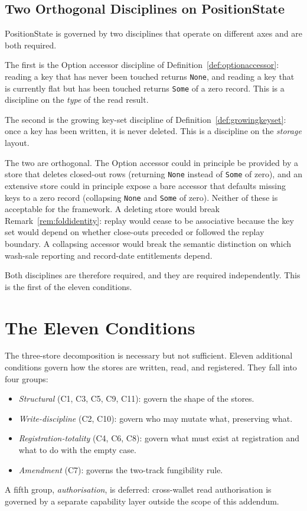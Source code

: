 \documentclass[11pt,a4paper]{article}
\begin{document}
\subsection{Two Orthogonal Disciplines on PositionState}

PositionState is governed by two disciplines that operate on different axes and are both required.

The first is the Option accessor discipline of Definition~\ref{def:optionaccessor}: reading a key that has never been touched returns \texttt{None}, and reading a key that is currently flat but has been touched returns \texttt{Some} of a zero record. This is a discipline on the \emph{type} of the read result.

The second is the growing key-set discipline of Definition~\ref{def:growingkeyset}: once a key has been written, it is never deleted. This is a discipline on the \emph{storage} layout.

The two are orthogonal. The Option accessor could in principle be provided by a store that deletes closed-out rows (returning \texttt{None} instead of \texttt{Some} of zero), and an extensive store could in principle expose a bare accessor that defaults missing keys to a zero record (collapsing \texttt{None} and \texttt{Some} of zero). Neither of these is acceptable for the framework. A deleting store would break Remark~\ref{rem:foldidentity}: replay would cease to be associative because the key set would depend on whether close-outs preceded or followed the replay boundary. A collapsing accessor would break the semantic distinction on which wash-sale reporting and record-date entitlements depend.

Both disciplines are therefore required, and they are required independently. This is the first of the eleven conditions.

\clearpage
\section{The Eleven Conditions}
\label{sec:conditions}

The three-store decomposition is necessary but not sufficient. Eleven additional conditions govern how the stores are written, read, and registered. They fall into four groups:
\begin{itemize}[leftmargin=*,nosep]
\item \emph{Structural} (C1, C3, C5, C9, C11): govern the shape of the stores.
\item \emph{Write-discipline} (C2, C10): govern who may mutate what, preserving what.
\item \emph{Registration-totality} (C4, C6, C8): govern what must exist at registration and what to do with the empty case.
\item \emph{Amendment} (C7): governs the two-track fungibility rule.
\end{itemize}
A fifth group, \emph{authorisation}, is deferred: cross-wallet read authorisation is governed by a separate capability layer outside the scope of this addendum.
\end{document}
